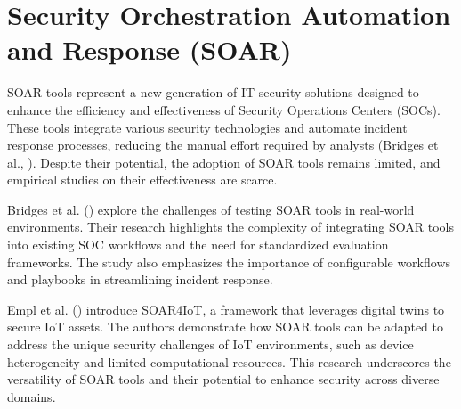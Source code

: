 

\chapter{Security Orchestration Automation and Response (SOAR)} \label{cha:soar}

SOAR tools represent a new generation of IT security solutions designed to enhance the efficiency and effectiveness of Security Operations Centers (SOCs). These tools integrate various security technologies and automate incident response processes, reducing the manual effort required by analysts (Bridges et al., \citeyear{bridges_testing_2023}). Despite their potential, the adoption of SOAR tools remains limited, and empirical studies on their effectiveness are scarce.

Bridges et al. (\citeyear{bridges_testing_2023}) explore the challenges of testing SOAR tools in real-world environments. Their research highlights the complexity of integrating SOAR tools into existing SOC workflows and the need for standardized evaluation frameworks. The study also emphasizes the importance of configurable workflows and playbooks in streamlining incident response.

Empl et al. (\citeyear{empl_soar4iot_2022}) introduce SOAR4IoT, a framework that leverages digital twins to secure IoT assets. The authors demonstrate how SOAR tools can be adapted to address the unique security challenges of IoT environments, such as device heterogeneity and limited computational resources. This research underscores the versatility of SOAR tools and their potential to enhance security across diverse domains.
